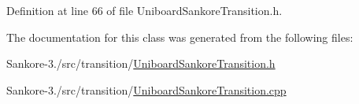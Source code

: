 Definition at line 66 of file Uniboard\-Sankore\-Transition.\-h.



The documentation for this class was generated from the following files\-:\begin{DoxyCompactItemize}
\item 
Sankore-\/3./src/transition/\hyperlink{_uniboard_sankore_transition_8h}{Uniboard\-Sankore\-Transition.\-h}\item 
Sankore-\/3./src/transition/\hyperlink{_uniboard_sankore_transition_8cpp}{Uniboard\-Sankore\-Transition.\-cpp}\end{DoxyCompactItemize}
